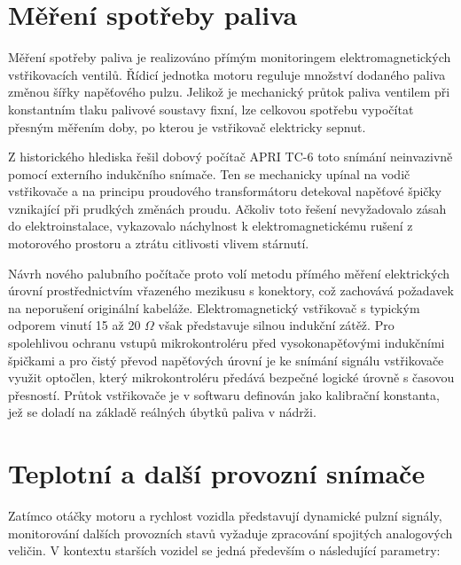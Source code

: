 \section{Měření spotřeby paliva}
Měření spotřeby paliva je realizováno přímým monitoringem elektromagnetických vstřikovacích ventilů. 
Řídicí jednotka motoru reguluje množství dodaného paliva změnou šířky napěťového pulzu. 
Jelikož je mechanický průtok paliva ventilem při konstantním tlaku palivové soustavy fixní, lze celkovou spotřebu vypočítat přesným měřením doby, 
po kterou je vstřikovač elektricky sepnut.

Z historického hlediska řešil dobový počítač APRI TC-6 toto snímání neinvazivně pomocí externího indukčního snímače. 
Ten se mechanicky upínal na vodič vstřikovače a na principu proudového transformátoru detekoval napěťové špičky vznikající při prudkých změnách proudu. 
Ačkoliv toto řešení nevyžadovalo zásah do elektroinstalace, vykazovalo náchylnost k elektromagnetickému rušení z motorového prostoru a ztrátu citlivosti vlivem stárnutí.

Návrh nového palubního počítače proto volí metodu přímého měření elektrických úrovní prostřednictvím vřazeného mezikusu s konektory, 
což zachovává požadavek na neporušení originální kabeláže. Elektromagnetický vstřikovač s typickým odporem vinutí 15 až 20 $\Omega$ však představuje silnou indukční zátěž. 
Pro spolehlivou ochranu vstupů mikrokontroléru před vysokonapěťovými indukčními špičkami a pro čistý převod napěťových úrovní je ke snímání signálu vstřikovače využit optočlen, 
který mikrokontroléru předává bezpečné logické úrovně s časovou přesností. Průtok vstřikovače je v softwaru definován jako kalibrační konstanta, 
jež se doladí na základě reálných úbytků paliva v nádrži.

\section{Teplotní a další provozní snímače}
Zatímco otáčky motoru a rychlost vozidla představují dynamické pulzní signály, monitorování dalších provozních stavů vyžaduje zpracování spojitých analogových veličin. 
V kontextu starších vozidel se jedná především o následující parametry:

